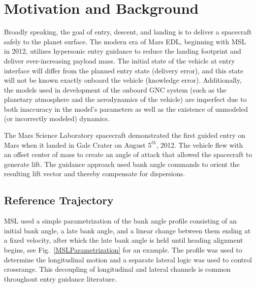 \documentclass[10pt,a4paper]{article}
\begin{document}
	\section{Motivation and Background}

	Broadly speaking, the goal of entry, descent, and landing is to deliver a spacecraft safely to the planet surface. The modern era of Mars EDL, beginning with MSL in 2012, utilizes hypersonic entry guidance to reduce the landing footprint and deliver ever-increasing payload mass. The initial state of the vehicle at entry interface will differ from the planned entry state (delivery error), and this state will not be known exactly onboard the vehicle (knowledge error). Additionally, the models used in development of the onboard GNC system (such as the planetary atmosphere and the aerodynamics of the vehicle) are imperfect due to both inaccuracy in the model's parameters as well as the existence of unmodeled (or incorrectly modeled) dynamics.
	
	The Mars Science Laboratory spacecraft demonstrated the first guided entry on Mars when it landed in Gale Crater on August $5^{th}$, 2012. The vehicle flew with an offset center of mass to create an angle of attack that allowed the spacecraft to generate lift. The guidance approach used bank angle commands to orient the resulting lift vector and thereby compensate for dispersions.\cite{MSL_EDL_Overview_JPL}
	
	\subsection{Reference Trajectory}
	MSL used a simple parametrization of the bank angle profile consisting of an initial bank angle, a late bank angle, and a linear change between them ending at a fixed velocity, after which the late bank angle is held until heading alignment begins, see Fig.~\ref{MSLParametrization} for an example. The profile was used to determine the longitudinal motion and a separate lateral logic was used to control crossrange. This decoupling of longitudinal and lateral channels is common throughout entry guidance literature.
	
\end{document}
